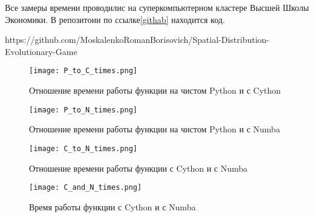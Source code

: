 \documentclass[a4paper,12pt]{article}
\begin{document}
Все замеры времени проводилис на суперкомпьютерном кластере Высшей Школы Экономики. В репозитоии по ссылке\ref{githab} находится код.


\begin{thebibliography}{1}

\label{githab}
https://github.com/MoskalenkoRomanBorisovich/Spatial-Distribution-Evolutionary-Game

\end{thebibliography}

\listoffigures

\begin{figure}[h]
	 \centering
    	\texttt{[image: P\_to\_C\_times.png]}
    	\caption{Отношение времени работы функции на чистом Python и с Cython}
	\label{fig:Fcgraph}
\end{figure}

\begin{figure}[h]
	 \centering
    	\texttt{[image: P\_to\_N\_times.png]}
    	\caption{Отношение времени работы функции на чистом Python и с Numba}
	\label{fig:Fcgraph}
\end{figure}

\begin{figure}[h!]
	 \centering
    	\texttt{[image: C\_to\_N\_times.png]}
    	\caption{Отношение времени работы функции с Cython и с Numba}
	\label{fig:Fcgraph}
\end{figure}

\begin{figure}[h!]
	 \centering
    	\texttt{[image: C\_and\_N\_times.png]}
    	\caption{ Время работы функции с Cython и с Numba}
	\label{fig:Fcgraph}
\end{figure}
\end{document}
